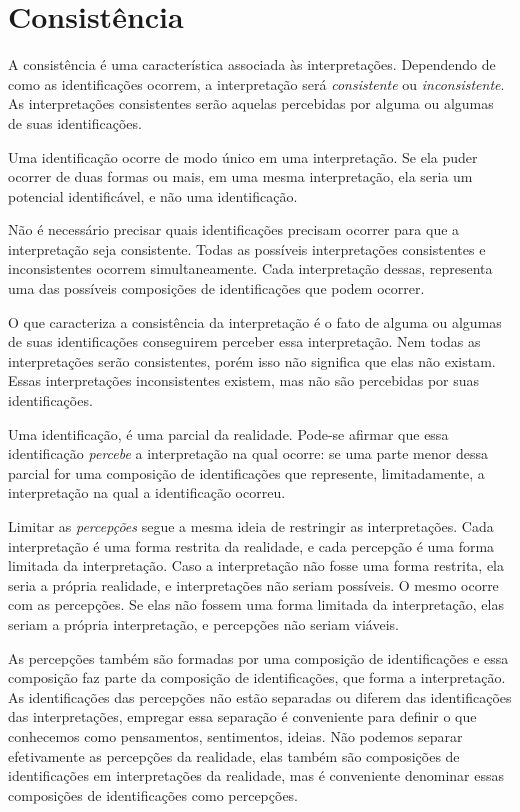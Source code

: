 \documentclass[11pt]{article}
\begin{document}
	\section{Consistência} \label{pt-s5}
	
	A consistência é uma característica associada às interpretações. Dependendo de como as identificações ocorrem, a interpretação será \textit{consistente} ou \textit{inconsistente}. As interpretações consistentes serão aquelas percebidas por alguma ou algumas de suas identificações.
	
	Uma identificação ocorre de modo único em uma interpretação. Se ela puder ocorrer de duas formas ou mais, em uma mesma interpretação, ela seria um potencial identificável, e não uma identificação.
	
	Não é necessário precisar quais identificações precisam ocorrer para que a interpretação seja consistente. Todas as possíveis interpretações consistentes e inconsistentes ocorrem simultaneamente. Cada interpretação dessas, representa uma das possíveis composições de identificações que podem ocorrer.
	
	O que caracteriza a consistência da interpretação é o fato de alguma ou algumas de suas identificações conseguirem perceber essa interpretação. Nem todas as interpretações serão consistentes, porém isso não significa que elas não existam. Essas interpretações inconsistentes existem, mas não são percebidas por suas identificações. 
	
	Uma identificação, é uma parcial da realidade. Pode-se afirmar que essa identificação \textit{percebe} a interpretação na qual ocorre: se uma parte menor dessa parcial for uma composição de identificações que represente, limitadamente, a interpretação na qual a identificação ocorreu.
	
	Limitar as \textit{percepções} segue a mesma ideia de restringir as interpretações. Cada interpretação é uma forma restrita da realidade, e cada percepção é uma forma limitada da interpretação. Caso a interpretação não fosse uma forma restrita, ela seria a própria realidade, e interpretações não seriam possíveis. O mesmo ocorre com as percepções. Se elas não fossem uma forma limitada da interpretação, elas seriam a própria interpretação, e percepções não seriam viáveis.
	
	As percepções também são formadas por uma composição de identificações e essa composição faz parte da composição de identificações, que forma a interpretação. As identificações das percepções não estão separadas ou diferem das identificações das interpretações, empregar essa separação é conveniente para definir o que conhecemos como pensamentos, sentimentos, ideias. Não podemos separar efetivamente as percepções da realidade, elas também são composições de identificações em interpretações da realidade, mas é conveniente denominar essas composições de identificações como percepções.
	
\end{document}
